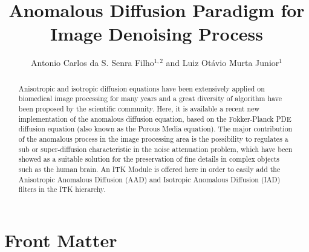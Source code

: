 \documentclass{InsightArticle}
\title{Anomalous Diffusion Paradigm for Image Denoising Process}
\author{Antonio Carlos da S. Senra Filho$^{1,2}$ and Luiz Ot\'{a}vio Murta Junior$^{1}$}
\newcommand{\IJhandlerIDnumber}{3565}
\begin{document}
%
%
\IJhandlefooter{\IJhandlerIDnumber}


\ifpdf
\else
\fi


\maketitle


\ifhtml
\chapter*{Front Matter\label{front}}
\fi


\begin{abstract}
\noindent
Anisotropic and isotropic diffusion equations have been extensively applied on biomedical image processing for many years and a great diversity of algorithm have been proposed by the scientific community. Here, it is available a recent new implementation of the anomalous diffusion equation, based on the Fokker-Planck PDE diffusion equation (also known as the Porous Media equation). The major contribution of the anomalous process in the image processing area is the possibility to regulates a sub or super-diffusion characteristic in the noise attenuation problem, which have been showed as a suitable solution for the preservation of fine details in complex objects such as the human brain. An ITK Module is offered here in order to easily add the Anisotropic Anomalous Diffusion (AAD) and Isotropic Anomalous Diffusion (IAD) filters in the ITK hierarchy.

% 
% 

\end{abstract}
\end{document}
